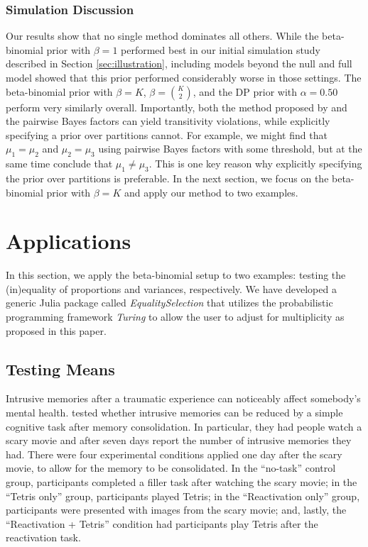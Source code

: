 \documentclass[11pt,a4paper]{article}
\theoremstyle{definition} %
\theoremstyle{case}
\begin{document}
\subsubsection{Simulation Discussion}
Our results show that no single method dominates all others. While the beta-binomial prior with $\beta = 1$ performed best in our initial simulation study described in Section \ref{sec:illustration}, including models beyond the null and full model showed that this prior performed considerably worse in those settings. The beta-binomial prior with $\beta = K$, $\beta = {K \choose 2}$, and the DP prior with $\alpha = 0.50$ perform very similarly overall. Importantly, both the method proposed by \textcite{westfall1997bayesian} and the pairwise Bayes factors can yield transitivity violations, while explicitly specifying a prior over partitions cannot. For example, we might find that $\mu_1 = \mu_2$ and $\mu_2 = \mu_3$ using pairwise Bayes factors with some threshold, but at the same time conclude that $\mu_1 \neq \mu_3$. This is one key reason why explicitly specifying the prior over partitions is preferable. In the next section, we focus on the beta-binomial prior with $\beta = K$ and apply our method to two examples.

\section{Applications} \label{sec:applications}
In this section, we apply the beta-binomial setup to two examples: testing the (in)equality of proportions and variances, respectively. We have developed a generic Julia package called \textit{EqualitySelection} that utilizes the probabilistic programming framework \textit{Turing} to allow the user to adjust for multiplicity as proposed in this paper. %


\iffalse
\subsection{Testing Means}
Intrusive memories after a traumatic experience can noticeably affect somebody's mental health. \textcite{james2015computer} tested whether intrusive memories can be reduced by a simple cognitive task after memory consolidation. In particular, they had people watch a scary movie and after seven days report the number of intrusive memories they had. There were four experimental conditions applied one day after the scary movie, to allow for the memory to be consolidated. In the ``no-task'' control group, participants completed a filler task after watching the scary movie; in the ``Tetris only'' group, participants played Tetris; in the ``Reactivation only'' group, participants were presented with images from the scary movie; and, lastly, the ``Reactivation + Tetris'' condition had participants play Tetris after the reactivation task.
\end{document}
